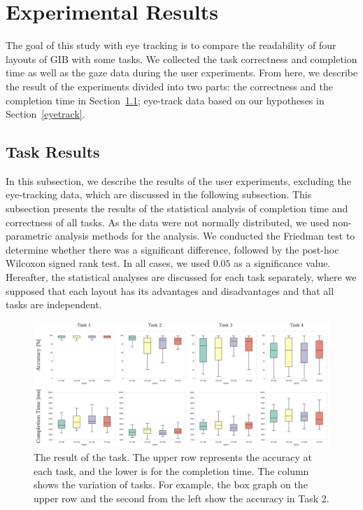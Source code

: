 \documentclass[review]{vgtc}                 %
\begin{document}
\section{Experimental Results}

The goal of this study with eye tracking is to compare the readability of four layouts of GIB with some tasks. We collected the task correctness and completion time as well as the gaze data during the user experiments.
From here, we describe the result of the experiments divided into two parts: the correctness and the completion time in Section~\ref{taskResult}; eye-track data based on our hypotheses in Section~\ref{eyetrack}.

\subsection{Task Results}
\label{taskResult}

In this subsection, we describe the results of the user experiments, excluding the eye-tracking data, which are discussed in the following subsection.
This subsection presents the results of the statistical analysis of completion time and correctness of all tasks.
As the data were not normally distributed, we used non-parametric analysis methods for the analysis.
We conducted the Friedman test to determine whether there was a significant difference, followed by the post-hoc Wilcoxon signed rank test. In all cases, we used $0.05$ as a significance value.
Hereafter, the statistical analyses are discussed for each task separately, where we supposed that each layout has its advantages and disadvantages and that all tasks are independent.

\begin{figure}[t]
  \begin{center}
    \includegraphics[width=1\textwidth]{pictures/results.png}
    \caption{The result of the task. The upper row represents the accuracy at each task, and the lower is for the completion time. The column shows the variation of tasks. For example, the box graph on the upper row and the second from the left show the accuracy in Task 2.}
    \label{results}
  \end{center}
\end{figure}
\end{document}
